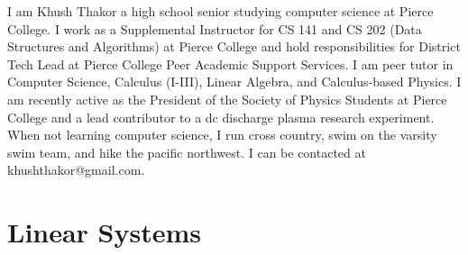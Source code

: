 \documentclass[12pt]{article}
\begin{document}
\par
\begin{multicols}{2}
I am Khush Thakor a high school senior studying computer science at Pierce College. I work as a Supplemental Instructor for CS 141 and CS 202 (Data Structures and Algorithms) at Pierce College and hold responsibilities for District Tech Lead at Pierce College Peer Academic Support Services. I am peer tutor in Computer Science, Calculus (I-III), Linear Algebra, and Calculus-based Physics. I am recently active as the President of the Society of Physics Students at Pierce College and a lead contributor to a dc discharge plasma research experiment. When not learning computer science, I run cross country, swim on the varsity swim team, and hike the pacific northwest. I can be contacted at khushthakor@gmail.com.
\end{multicols}
\pagebreak
\pagebreak
\section{Linear Systems}
\makeatother
\end{document}
